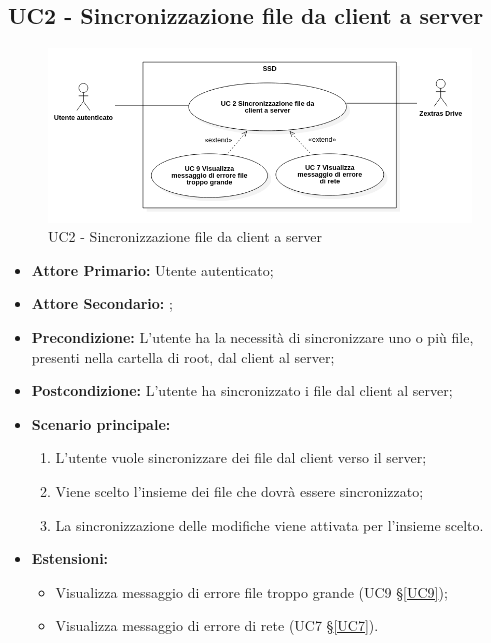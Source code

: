 \subsection{UC2 - Sincronizzazione file da client a server}
\label{UC2}
\begin{figure}[H]
    \centering
    \includegraphics[scale = 0.5]{components/img/UC2.png}
    \caption{UC2 - Sincronizzazione file da client a server}
\end{figure}
\begin{itemize}
\item \textbf{Attore Primario:} Utente autenticato;
\item \textbf{Attore Secondario:} ;
\item \textbf{Precondizione:} L'utente ha la necessità di sincronizzare uno o più file, presenti nella cartella di root, dal client al server;
\item \textbf{Postcondizione:} L'utente ha sincronizzato i file dal client al server;
\item \textbf{Scenario principale:}
\begin{enumerate}
\item L'utente vuole sincronizzare dei file dal client verso il server;
\item Viene scelto l'insieme dei file che dovrà essere sincronizzato;
\item La sincronizzazione delle modifiche viene attivata per l'insieme scelto.
\end{enumerate}
\item \textbf{Estensioni:}
    \begin{itemize}
    \item Visualizza messaggio di errore file troppo grande (UC9 \S{}\ref{UC9});
    \item Visualizza messaggio di errore di rete (UC7 \S{}\ref{UC7}).
    \end{itemize}
\end{itemize}
